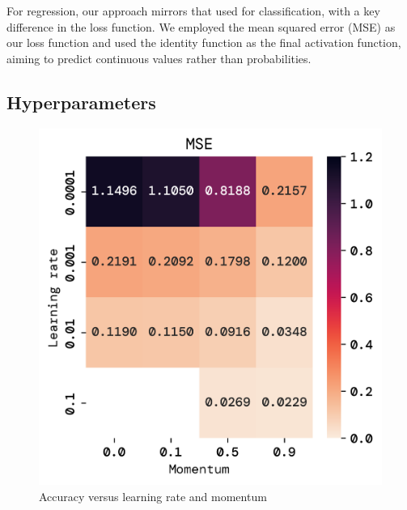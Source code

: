 \documentclass[twoside,11pt]{report}
\begin{document}
    For regression, our approach mirrors that used for classification, with a key difference in the loss function. 
    We employed the mean squared error (MSE) as our loss function and used the identity function as the final 
    activation function, aiming to predict continuous values rather than probabilities.

\subsection*{Hyperparameters}
\label{sec:hyperparameters2}


    \begin{figure}[!ht]
        \begin{minipage}[t]{0.5\textwidth - 1mm}
            \begin{center}
                \includegraphics[width=\textwidth]{../runsAndFigures/MSE_lr_gamma.png}
            \end{center}
            \caption{Accuracy versus learning rate and momentum
            }\label{fig:MSE_lr_gamma}
        \end{minipage}
        \hspace{2mm}
        \begin{minipage}[t]{0.5\textwidth - 1mm}
            \begin{center}

\end{center}
\end{minipage}
\end{figure}
\end{document}
